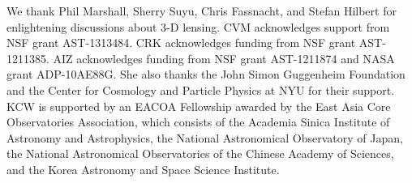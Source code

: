 \documentclass{emulateapj}
\begin{document}
\acknowledgements
We thank Phil Marshall, Sherry Suyu, Chris Fassnacht, and Stefan Hilbert for enlightening discussions about 3-D lensing. CVM acknowledges support from NSF grant AST-1313484. CRK acknowledges funding from NSF grant AST-1211385. AIZ acknowledges funding from NSF grant AST-1211874 and NASA grant ADP-10AE88G. She also thanks the John Simon Guggenheim Foundation and the Center for Cosmology and Particle Physics at NYU for their support. KCW is supported by an EACOA Fellowship awarded by the East Asia Core Observatories Association, which consists of the Academia Sinica Institute of Astronomy and Astrophysics, the National Astronomical Observatory of Japan, the National Astronomical Observatories of the Chinese Academy of Sciences, and the Korea Astronomy and Space Science Institute.




\end{document}
